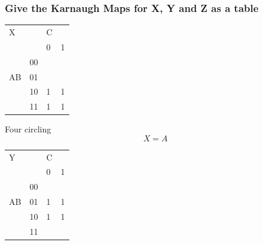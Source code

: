 \documentclass[12pt, a4paper]{article}
\begin{document}
			\subsubsection{Give the Karnaugh Maps for X, Y and Z as a table}
				\begin{table}[h!]
				\begin{tabular}{llll}
				X                       &                         & C                      &                        \\ \cline{3-4} 
				                        & \multicolumn{1}{l|}{}   & \multicolumn{1}{l|}{0} & \multicolumn{1}{l|}{1} \\ \cline{2-4} 
				\multicolumn{1}{l|}{}   & \multicolumn{1}{l|}{00} & \multicolumn{1}{l|}{}  & \multicolumn{1}{l|}{}  \\ \cline{2-4} 
				\multicolumn{1}{l|}{AB} & \multicolumn{1}{l|}{01} & \multicolumn{1}{l|}{}  & \multicolumn{1}{l|}{}  \\ \cline{2-4} 
				\multicolumn{1}{l|}{}   & \multicolumn{1}{l|}{10} & \multicolumn{1}{l|}{1} & \multicolumn{1}{l|}{1} \\ \cline{2-4} 
				\multicolumn{1}{l|}{}   & \multicolumn{1}{l|}{11} & \multicolumn{1}{l|}{1} & \multicolumn{1}{l|}{1} \\ \cline{2-4} 
				\end{tabular}
				\end{table}
				Four circling
				$$X=A$$
				\begin{table}[h!]
				\begin{tabular}{llll}
				Y                       &                         & C                      &                        \\ \cline{3-4} 
				                        & \multicolumn{1}{l|}{}   & \multicolumn{1}{l|}{0} & \multicolumn{1}{l|}{1} \\ \cline{2-4} 
				\multicolumn{1}{l|}{}   & \multicolumn{1}{l|}{00} & \multicolumn{1}{l|}{}  & \multicolumn{1}{l|}{}  \\ \cline{2-4} 
				\multicolumn{1}{l|}{AB} & \multicolumn{1}{l|}{01} & \multicolumn{1}{l|}{1} & \multicolumn{1}{l|}{1} \\ \cline{2-4} 
				\multicolumn{1}{l|}{}   & \multicolumn{1}{l|}{10} & \multicolumn{1}{l|}{1} & \multicolumn{1}{l|}{1} \\ \cline{2-4} 
				\multicolumn{1}{l|}{}   & \multicolumn{1}{l|}{11} & \multicolumn{1}{l|}{}  & \multicolumn{1}{l|}{}  \\ \cline{2-4} 
				\end{tabular}
				\end{table}
\end{document}
